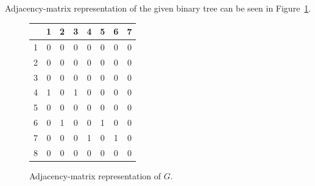 Adjacency-matrix representation of the given binary tree can be seen in
Figure~\ref{fig:Ex2-AdjMatrixRep}.

\begin{figure}[h]
	\begin{center}
		\begin{tabular}{c|c c c c c c c|}
			  & 1 & 2 & 3 & 4 & 5 & 6 & 7 \\
			\hline
			1 & 0 & 0 & 0 & 0 & 0 & 0 & 0 \\
			2 & 0 & 0 & 0 & 0 & 0 & 0 & 0 \\
			3 & 0 & 0 & 0 & 0 & 0 & 0 & 0 \\
			4 & 1 & 0 & 1 & 0 & 0 & 0 & 0 \\
			5 & 0 & 0 & 0 & 0 & 0 & 0 & 0 \\
			6 & 0 & 1 & 0 & 0 & 1 & 0 & 0 \\
			7 & 0 & 0 & 0 & 1 & 0 & 1 & 0 \\
			8 & 0 & 0 & 0 & 0 & 0 & 0 & 0 \\
			\hline
		\end{tabular}
	\end{center}
	\caption{Adjacency-matrix representation of $G$.}
	\label{fig:Ex2-AdjMatrixRep}
\end{figure}

